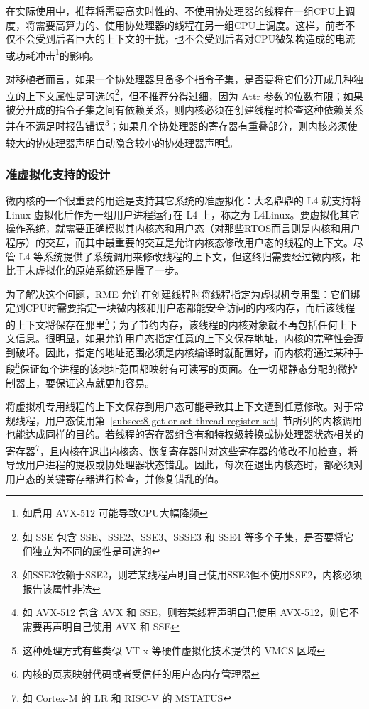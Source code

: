 \begin{enumerate}
  在实际使用中，推荐将需要高实时性的、不使用协处理器的线程在一组CPU上调度，将需要高算力的、使用协处理器的线程在另一组CPU上调度。这样，前者不仅不会受到后者巨大的上下文的干扰，也不会受到后者对CPU微架构造成的电流或功耗冲击\footnote{如启用 AVX-512 可能导致CPU大幅降频}的影响。

  对移植者而言，如果一个协处理器具备多个指令子集，是否要将它们分开成几种独立的上下文属性是可选的\footnote{如 SSE 包含 SSE、SSE2、SSE3、SSSE3 和 SSE4 等多个子集，是否要将它们独立为不同的属性是可选的}，但不推荐分得过细，因为 Attr 参数的位数有限；如果被分开成的指令子集之间有依赖关系，则内核必须在创建线程时检查这种依赖关系并在不满足时报告错误\footnote{如SSE3依赖于SSE2，则若某线程声明自己使用SSE3但不使用SSE2，内核必须报告该属性非法}；如果几个协处理器的寄存器有重叠部分，则内核必须使较大的协处理器声明自动隐含较小的协处理器声明\footnote{如 AVX-512 包含 AVX 和 SSE，则若某线程声明自己使用 AVX-512，则它不需要再声明自己使用 AVX 和 SSE}。
\end{enumerate}

\subsubsection{准虚拟化支持的设计}\label{subsubsec:4-paravirtualization-support-design}

微内核的一个很重要的用途是支持其它系统的准虚拟化：大名鼎鼎的 L4 就支持将 Linux 虚拟化后作为一组用户进程运行在 L4 上，称之为 L4Linux。要虚拟化其它操作系统，就需要正确模拟其内核态和用户态（对那些RTOS而言则是内核和用户程序）的交互，而其中最重要的交互是允许内核态修改用户态的线程的上下文。尽管 L4 等系统提供了系统调用来修改线程的上下文，但这终归需要经过微内核，相比于未虚拟化的原始系统还是慢了一步。

为了解决这个问题，RME 允许在创建线程时将线程指定为虚拟机专用型：它们绑定到CPU时需要指定一块微内核和用户态都能安全访问的内核内存，而后该线程的上下文将保存在那里\footnote{这种处理方式有些类似 VT-x 等硬件虚拟化技术提供的 VMCS 区域}；为了节约内存，该线程的内核对象就不再包括任何上下文信息。很明显，如果允许用户态指定任意的上下文保存地址，内核的完整性会遭到破坏。因此，指定的地址范围必须是内核编译时就配置好，而内核将通过某种手段\footnote{内核的页表映射代码或者受信任的用户态内存管理器}保证每个进程的该地址范围都映射有可读写的页面。在一切都静态分配的微控制器上，要保证这点就更加容易。

将虚拟机专用线程的上下文保存到用户态可能导致其上下文遭到任意修改。对于常规线程，用户态使用第~\ref{subsec:8-get-or-set-thread-register-set}~节所列的内核调用也能达成同样的目的。若线程的寄存器组含有和特权级转换或协处理器状态相关的寄存器\footnote{如 Cortex-M 的 LR 和 RISC-V 的 MSTATUS}，且内核在退出内核态、恢复寄存器时对这些寄存器的修改不加检查，将导致用户进程的提权或协处理器状态错乱。因此，每次在退出内核态时，都必须对用户态的关键寄存器进行检查，并修复错乱的值。


